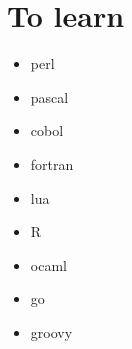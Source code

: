 \documentclass{article}
\begin{document}
\section{To learn}
\begin{itemize}
	\item perl
	\item pascal
	\item cobol
	\item fortran
	\item lua
	\item R
	\item ocaml
	\item go
	\item groovy
\end{itemize}
\end{document}
